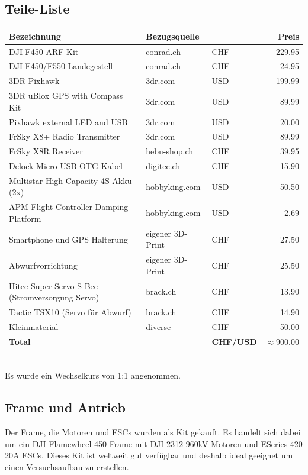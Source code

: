 \subsection{Teile-Liste}

\begin{tabularx}{\textwidth}{|X|l|l r|}
	\hline
	\textbf{Bezeichnung} & \textbf{Bezugsquelle} && \textbf{Preis}\\
	\hline \hline
	DJI F450 ARF Kit & conrad.ch & CHF &229.95 \\\hline
	DJI F450/F550 Landegestell & conrad.ch & CHF &24.95 \\\hline
	3DR Pixhawk & 3dr.com & USD& 199.99 \\\hline
	3DR uBlox GPS with Compass Kit & 3dr.com & USD &89.99 \\\hline
	Pixhawk external LED and USB & 3dr.com & USD & 20.00 \\\hline
	FrSky X8+ Radio Transmitter & 3dr.com & USD & 89.99 \\\hline
	FrSky X8R Receiver & hebu-shop.ch & CHF & 39.95 \\\hline
	Delock Micro USB OTG Kabel & digitec.ch & CHF &15.90 \\\hline
	Multistar High Capacity 4S Akku (2x) & hobbyking.com & USD& 50.50 \\\hline
	APM Flight Controller Damping Platform & hobbyking.com & USD& 2.69 \\\hline
	Smartphone und GPS Halterung & eigener 3D-Print & CHF &27.50\\\hline
	Abwurfvorrichtung & eigener 3D-Print & CHF &25.50\\\hline
	Hitec Super Servo S-Bec (Stromversorgung Servo) & brack.ch & CHF &13.90\\\hline
	Tactic TSX10 (Servo für Abwurf) & brack.ch & CHF & 14.90\\\hline
	Kleinmaterial & diverse & CHF & 50.00\\\hline
	\hline
	\textbf{Total} & & \textbf{CHF/USD} & $\boldsymbol{\approx 900.00}$\\\hline
\end{tabularx}\\

Es wurde ein Wechselkurs von 1:1 angenommen.

\subsection{Frame und Antrieb}

Der Frame, die Motoren und ESCs wurden als Kit gekauft. Es handelt sich dabei um ein DJI Flamewheel 450 Frame mit DJI 2312 960kV Motoren und ESeries 420 20A ESCs. Dieses Kit ist weltweit gut verfügbar und deshalb ideal geeignet um einen Versuchsaufbau zu erstellen.

